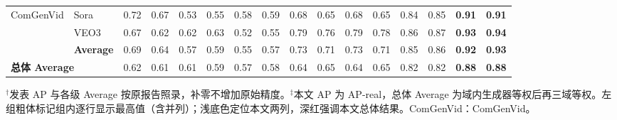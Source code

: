 \begin{table}[t]
{\begin{tabular*}{\textwidth}{@{\extracolsep{\fill}}ll*{12}{c}*{2}{>{\columncolor{mainred!4}}c}@{}}
    \midrule
    \multirow{3}{*}{ComGenVid} & Sora & 0.72 & 0.67 & 0.53 & 0.55 & 0.58 & 0.59 & 0.68 & 0.65 & 0.68 & 0.65 & 0.84 & 0.85 & \textbf{0.91} & \textbf{0.91} \\
     & VEO3 & 0.67 & 0.62 & 0.62 & 0.63 & 0.52 & 0.55 & 0.79 & 0.76 & 0.79 & 0.78 & 0.86 & 0.87 & \textbf{0.93} & \textbf{0.94} \\
    \cmidrule(l){2-16}
     & \textbf{Average} & 0.69 & 0.64 & 0.57 & 0.59 & 0.55 & 0.57 & 0.73 & 0.71 & 0.73 & 0.71 & 0.85 & 0.86 & \textbf{0.92} & \textbf{0.93} \\
    \midrule
    \multicolumn{2}{l}{\textbf{总体 Average}} & 0.62 & 0.61 & 0.61 & 0.59 & 0.57 & 0.58 & 0.64 & 0.65 & 0.64 & 0.65 & 0.82 & 0.82 & \textcolor{mainred}{\textbf{0.88}} & \textcolor{mainred}{\textbf{0.88}} \\
    \bottomrule
  \end{tabular*}
  \par\vspace{2pt}
  \begin{minipage}{\textwidth}\scriptsize
  $^{\dagger}$发表 AP 与各级 Average 按原报告照录，补零不增加原始精度。$^{\ddagger}$本文 AP 为 AP-real，总体 Average 为域内生成器等权后再三域等权。左组粗体标记组内逐行显示最高值（含并列）；浅底色定位本文两列，深红强调本文总体结果。ComGenVid：ComGenVid。
  \end{minipage}}
\end{table}
